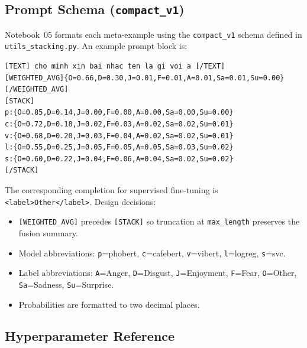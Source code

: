\documentclass[11pt,a4paper]{article}
\newcommand{\repo}[1]{\texttt{#1}}
\begin{document}
\subsection{Prompt Schema (\texttt{compact\_v1})}
Notebook~05 formats each meta-example using the \texttt{compact\_v1} schema defined in \repo{utils\_stacking.py}. An example prompt block is:
\begin{lstlisting}
[TEXT] cho minh xin bai nhac ten la gi voi a [/TEXT]
[WEIGHTED_AVG]{O=0.66,D=0.30,J=0.01,F=0.01,A=0.01,Sa=0.01,Su=0.00}[/WEIGHTED_AVG]
[STACK]
p:{O=0.85,D=0.14,J=0.00,F=0.00,A=0.00,Sa=0.00,Su=0.00}
c:{O=0.72,D=0.18,J=0.02,F=0.03,A=0.02,Sa=0.02,Su=0.01}
v:{O=0.68,D=0.20,J=0.03,F=0.04,A=0.02,Sa=0.02,Su=0.01}
l:{O=0.55,D=0.25,J=0.05,F=0.05,A=0.05,Sa=0.03,Su=0.02}
s:{O=0.60,D=0.22,J=0.04,F=0.06,A=0.04,Sa=0.02,Su=0.02}
[/STACK]
\end{lstlisting}
The corresponding completion for supervised fine-tuning is \texttt{<label>Other</label>}. Design decisions:
\begin{itemize}[nosep]
  \item \texttt{[WEIGHTED\_AVG]} precedes \texttt{[STACK]} so truncation at \texttt{max\_length} preserves the fusion summary.
  \item Model abbreviations: \texttt{p}=phobert, \texttt{c}=cafebert, \texttt{v}=vibert, \texttt{l}=logreg, \texttt{s}=svc.
  \item Label abbreviations: \texttt{A}=Anger, \texttt{D}=Disgust, \texttt{J}=Enjoyment, \texttt{F}=Fear, \texttt{O}=Other, \texttt{Sa}=Sadness, \texttt{Su}=Surprise.
  \item Probabilities are formatted to two decimal places.
\end{itemize}

\subsection{Hyperparameter Reference}
\end{document}
